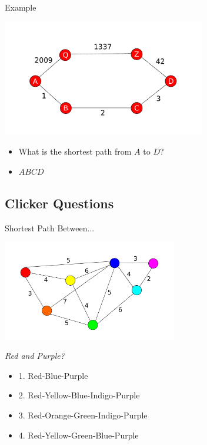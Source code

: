 \documentclass{beamer}
\begin{document}
\begin{frame}{Example}
	\centerline{\includegraphics[width=3.5in]{weighted_ex_1.pdf}}
	\begin{itemize}
	\item
		What is the shortest path from $A$ to $D$?
	\item
		$ABCD$
	\end{itemize}
\end{frame}

\subsection{Clicker Questions}
\begin{frame}{Shortest Path Between...}
	\centerline{\includegraphics[width=3.0in]{weighted.pdf}}
	\textit{Red and Purple?}
        \begin{itemize}
	\item
		1. Red-Blue-Purple
	\item
		2. Red-Yellow-Blue-Indigo-Purple
	\item
		3. Red-Orange-Green-Indigo-Purple
	\item
		4. Red-Yellow-Green-Blue-Purple
	\end{itemize}
\end{frame}
\end{document}
